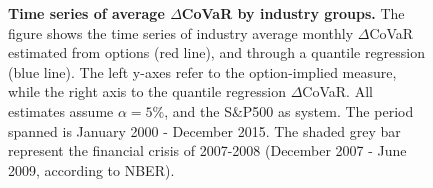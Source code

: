 \documentclass[11pt,a4paper,english]{article}
\begin{document}
\begin{figure}[H]
	\centering
	\captionsetup{singlelinecheck=true, font = footnotesize}
	\caption{
		\textbf{Time series of average $\Delta$CoVaR by industry groups.}
		The figure shows the time series of industry average monthly $\Delta$CoVaR estimated from options (red line), and through a quantile regression (blue line). The left y-axes refer to the option-implied measure, while the right axis to the quantile regression $\Delta$CoVaR. All estimates assume $\alpha = 5\%$, and the S\&P500 as system. The period spanned is January 2000 - December 2015. The shaded grey bar represent the financial crisis of 2007-2008 (December 2007 - June 2009, according to NBER).}
	\label{fig: tscomp}
\end{figure}

\begin{comment}
\begin{figure}[H]
\centering
\subfloat[][\emph{AIG}.]
{\texttt{[image: Figures/scatterAIG.pdf]}} \quad
\subfloat[][\emph{American Express}.]
{\texttt{[image: Figures/scatterAXP.pdf]}} \\
 \subfloat[][\emph{Bank of America}.]
{\texttt{[image: Figures/scatterBAC.pdf]}} \quad
\subfloat[][\emph{BB\&T Corp}.]
{\texttt{[image: Figures/scatterBBT.pdf]}} \\
\subfloat[][\emph{The Bank of New York Mellon Corp}.]
{\texttt{[image: Figures/scatterBK.pdf]}} \quad
\subfloat[][\emph{BlackRock Inc}.]
{\texttt{[image: Figures/scatterBLK.pdf]}}
\caption{\textbf{Scatter plot and fitted line for the VaR of single institutions against the S\&P500.}}
\label{fig:scattervar}
\end{figure}


\begin{figure}[H]\ContinuedFloat
	\centering
		\subfloat[][\emph{Berkshire Hathaway}.]
	{\texttt{[image: Figures/scatterBRK.pdf]}} \quad
	\subfloat[][\emph{Citi Group}.]
	{\texttt{[image: Figures/scatterC.pdf]}} \\
	\subfloat[][\emph{Capital One Financial}.]
	{\texttt{[image: Figures/scatterCOF.pdf]}} \quad
	\subfloat[][\emph{Goldman Sachs}.]
	{\texttt{[image: Figures/scatterGS.pdf]}} \\
	\subfloat[][\emph{JP Morgan Chase}.]
	{\texttt{[image: Figures/scatterJPM.pdf]}} \quad
	\subfloat[][\emph{Metlife}.]
	{\texttt{[image: Figures/scatterMET.pdf]}} 
	\caption{\textbf{Scatter plot and fitted line for the VaR of single institutions against the S\&P500 (continued).}}
\end{figure}
\end{comment}
\end{document}

